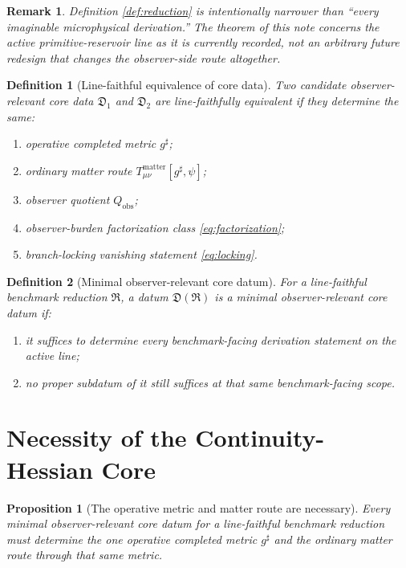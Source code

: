 \documentclass[11pt]{article}
\newcommand{\CompletedMetric}{g^{\sharp}}
\newcommand{\ObserverQuotient}{Q_{\mathrm{obs}}}
\newcommand{\Reduction}{\mathfrak R}
\newcommand{\CoreDatum}{\mathfrak D}
\newtheorem{definition}{Definition}
\newtheorem{proposition}{Proposition}
\newtheorem{remark}{Remark}
\begin{document}
\begin{remark}
Definition \ref{def:reduction} is intentionally narrower than ``every imaginable microphysical derivation.'' The theorem of this note concerns the active primitive-reservoir line as it is currently recorded, not an arbitrary future redesign that changes the observer-side route altogether.
\end{remark}

\begin{definition}[Line-faithful equivalence of core data]
\label{def:equiv}
Two candidate observer-relevant core data \(\CoreDatum_1\) and \(\CoreDatum_2\) are \emph{line-faithfully equivalent} if they determine the same:
\begin{enumerate}
    \item operative completed metric \(\CompletedMetric\);
    \item ordinary matter route \(T_{\mu\nu}^{\mathrm{matter}}[\CompletedMetric,\psi]\);
    \item observer quotient \(\ObserverQuotient\);
    \item observer-burden factorization class \eqref{eq:factorization};
    \item branch-locking vanishing statement \eqref{eq:locking}.
\end{enumerate}
\end{definition}

\begin{definition}[Minimal observer-relevant core datum]
\label{def:minimal}
For a line-faithful benchmark reduction \(\Reduction\), a datum \(\CoreDatum(\Reduction)\) is a \emph{minimal observer-relevant core datum} if:
\begin{enumerate}
    \item it suffices to determine every benchmark-facing derivation statement on the active line;
    \item no proper subdatum of it still suffices at that same benchmark-facing scope.
\end{enumerate}
\end{definition}

\section{Necessity of the Continuity-Hessian Core}

\begin{proposition}[The operative metric and matter route are necessary]
\label{prop:metric}
Every minimal observer-relevant core datum for a line-faithful benchmark reduction must determine the one operative completed metric \(\CompletedMetric\) and the ordinary matter route through that same metric.
\end{proposition}
\end{document}
